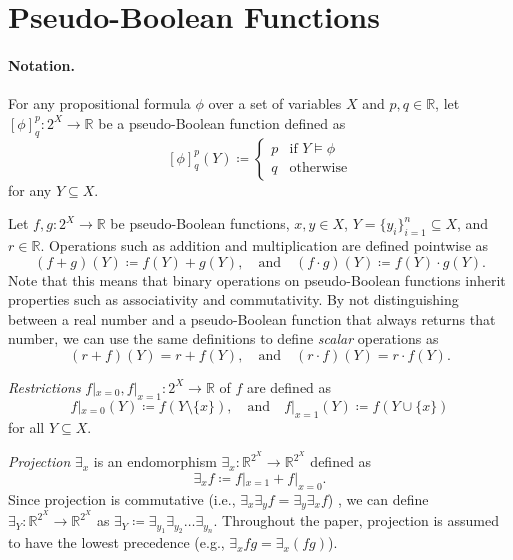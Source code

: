 \documentclass[runningheads]{llncs}
\begin{document}

\section{Pseudo-Boolean Functions}

\paragraph{Notation.} For any propositional formula $\phi$ over a set of
variables $X$ and $p, q \in \mathbb{R}$, let $[\phi]^p_q\colon 2^X \to
\mathbb{R}$ be a pseudo-Boolean function defined as
\[
  [\phi]^p_q(Y) \coloneqq
  \begin{cases}
    p & \text{if } Y \models \phi \\
    q & \text{otherwise}
  \end{cases}
\]
for any $Y \subseteq X$.

\begin{definition}[Operations] \label{def:operations}
  Let $f, g\colon 2^X \to \mathbb{R}$ be pseudo-Boolean functions, $x, y \in X$,
  $Y = \{y_i\}_{i=1}^n \subseteq X$, and $r \in \mathbb{R}$. Operations such as
  addition and multiplication are defined pointwise as
  \[
    (f+g)(Y) \coloneqq f(Y)+g(Y), \quad \text{and} \quad (f \cdot g)(Y)
    \coloneqq f(Y) \cdot g(Y).
  \]
  Note that this means that binary operations on pseudo-Boolean functions
  inherit properties such as associativity and commutativity. By not
  distinguishing between a real number and a pseudo-Boolean function that always
  returns that number, we can use the same definitions to define \emph{scalar}
  operations as
  \[
    (r+f)(Y) = r+f(Y), \quad \text{and} \quad (r \cdot f)(Y) = r \cdot f(Y).
  \]

  \emph{Restrictions} $f|_{x=0}, f|_{x=1}\colon 2^X \to \mathbb{R}$ of $f$ are
  defined as
  \[
    f|_{x=0}(Y) \coloneqq f(Y \setminus \{x\}), \quad \text{and} \quad
    f|_{x=1}(Y) \coloneqq f(Y \cup \{x\})
  \]
  for all $Y \subseteq X$.

  \emph{Projection} $\exists_x$ is an endomorphism $\exists_x\colon
  \mathbb{R}^{2^X} \to \mathbb{R}^{2^X}$ defined as
  \[
    \exists_xf \coloneqq f|_{x=1} + f|_{x=0}.
  \]
  Since projection is commutative (i.e., $\exists_x\exists_yf =
  \exists_y\exists_xf$) \cite{DBLP:conf/aaai/DudekPV20,DBLP:conf/cp/DudekPV20},
  we can define $\exists_Y\colon \mathbb{R}^{2^X} \to \mathbb{R}^{2^X}$ as
  $\exists_Y \coloneqq \exists_{y_1}\exists_{y_2}\dots\exists_{y_n}$. Throughout
  the paper, projection is assumed to have the lowest precedence (e.g.,
  $\exists_x fg = \exists_x (fg)$).
\end{definition}
\end{document}
